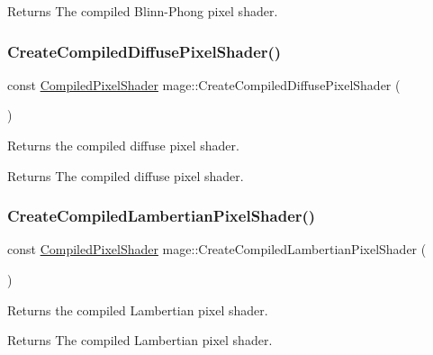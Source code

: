 \begin{DoxyReturn}{Returns}
The compiled Blinn-\/\+Phong pixel shader. 
\end{DoxyReturn}
\hypertarget{namespacemage_ae1d335b07238f7cd6e9bbe85895c607a}{}\label{namespacemage_ae1d335b07238f7cd6e9bbe85895c607a} 
\subsubsection{\texorpdfstring{Create\+Compiled\+Diffuse\+Pixel\+Shader()}{CreateCompiledDiffusePixelShader()}}
{\footnotesize\ttfamily const \hyperlink{structmage_1_1_compiled_pixel_shader}{Compiled\+Pixel\+Shader} mage\+::\+Create\+Compiled\+Diffuse\+Pixel\+Shader (\begin{DoxyParamCaption}{ }\end{DoxyParamCaption})}

Returns the compiled diffuse pixel shader.

\begin{DoxyReturn}{Returns}
The compiled diffuse pixel shader. 
\end{DoxyReturn}
\hypertarget{namespacemage_aed1a73bf0197b60071335329b0a3f171}{}\label{namespacemage_aed1a73bf0197b60071335329b0a3f171} 
\subsubsection{\texorpdfstring{Create\+Compiled\+Lambertian\+Pixel\+Shader()}{CreateCompiledLambertianPixelShader()}}
{\footnotesize\ttfamily const \hyperlink{structmage_1_1_compiled_pixel_shader}{Compiled\+Pixel\+Shader} mage\+::\+Create\+Compiled\+Lambertian\+Pixel\+Shader (\begin{DoxyParamCaption}{ }\end{DoxyParamCaption})}

Returns the compiled Lambertian pixel shader.

\begin{DoxyReturn}{Returns}
The compiled Lambertian pixel shader. 
\end{DoxyReturn}
\hypertarget{namespacemage_abbc94f13b39870cec62d921f7b581f6a}{}\label{namespacemage_abbc94f13b39870cec62d921f7b581f6a} 
